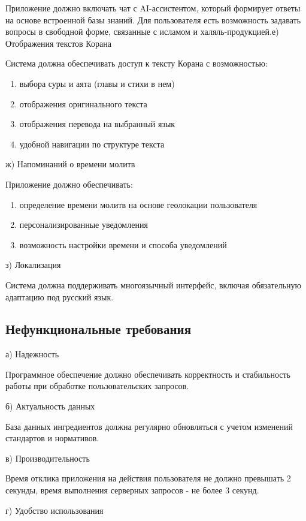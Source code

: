 Приложение должно включать чат с AI-ассистентом, который формирует ответы на основе встроенной базы знаний. Для пользователя есть возможность задавать вопросы в свободной форме, связанные с исламом и халяль-продукцией.е) Отображения текстов Корана


Система должна обеспечивать доступ к тексту Корана с возможностью:

\begin{enumerate}
	\item выбора суры и аята (главы и стихи в нем)
	\item отображения оригинального текста
	\item отображения перевода на выбранный язык
	\item удобной навигации по структуре текста
\end{enumerate}

ж) Напоминаний о времени молитв


Приложение должно обеспечивать:

\begin{enumerate}
	\item определение времени молитв на основе геолокации пользователя
	\item персонализированные уведомления
	\item возможность настройки времени и способа уведомлений
\end{enumerate}

з) Локализация


Система должна поддерживать многоязычный интерфейс, включая обязательную адаптацию под русский язык.


\subsection{Нефункциональные требования}


а) Надежность


Программное обеспечение должно обеспечивать корректность и стабильность работы при обработке пользовательских запросов.


б) Актуальность данных


База данных ингредиентов должна регулярно обновляться с учетом изменений стандартов и нормативов.


в) Производительность


Время отклика приложения на действия пользователя не должно превышать 2 секунды, время выполнения серверных запросов - не более 3 секунд.


г) Удобство использования


